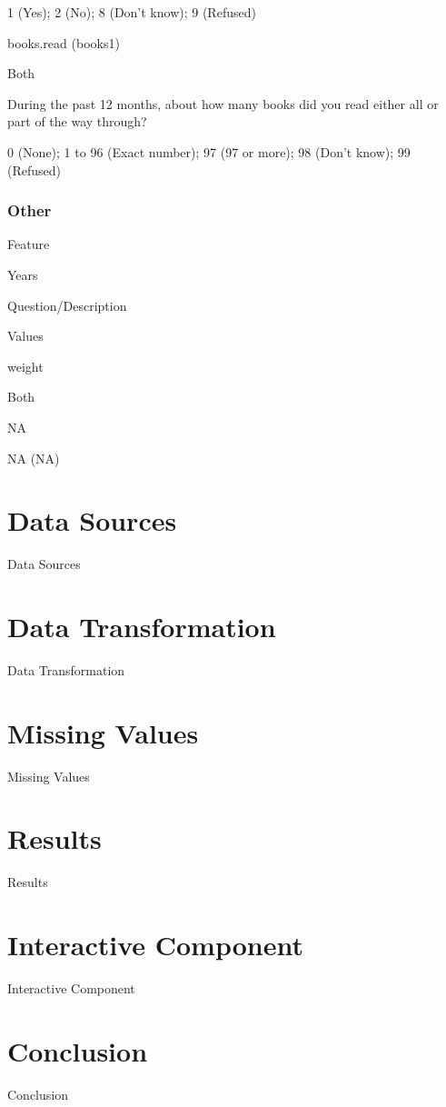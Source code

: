 \documentclass[]{book}
\begin{document}
1 (Yes); 2 (No); 8 (Don't know); 9 (Refused)

books.read (books1)

Both

During the past 12 months, about how many books did you read either all
or part of the way through?

0 (None); 1 to 96 (Exact number); 97 (97 or more); 98 (Don't know); 99
(Refused)

\subsection*{Other}\label{other}

Feature

Years

Question/Description

Values

weight

Both

NA

NA (NA)

\chapter{Data Sources}\label{data-sources}

Data Sources

\chapter{Data Transformation}\label{data-transformation}

Data Transformation

\chapter{Missing Values}\label{missing-values}

Missing Values

\chapter{Results}\label{results}

Results

\chapter{Interactive Component}\label{interactive-component}

Interactive Component

\chapter{Conclusion}\label{conclusion}

Conclusion


\end{document}
